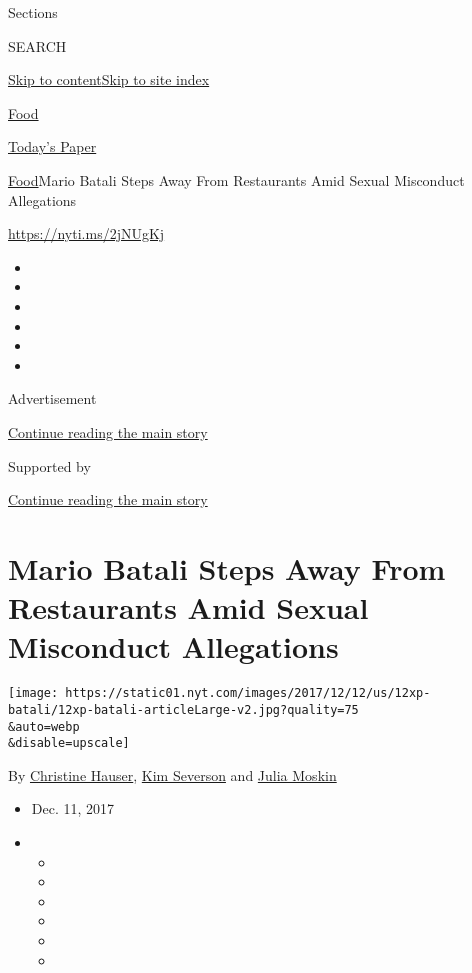 Sections

SEARCH

\protect\hyperlink{site-content}{Skip to
content}\protect\hyperlink{site-index}{Skip to site index}

\href{https://www.nytimes.com/section/food}{Food}

\href{https://myaccount.nytimes.com/auth/login?response_type=cookie\&client_id=vi}{}

\href{https://www.nytimes.com/section/todayspaper}{Today's Paper}

\href{/section/food}{Food}\textbar{}Mario Batali Steps Away From
Restaurants Amid Sexual Misconduct Allegations

\url{https://nyti.ms/2jNUgKj}

\begin{itemize}
\item
\item
\item
\item
\item
\item
\end{itemize}

Advertisement

\protect\hyperlink{after-top}{Continue reading the main story}

Supported by

\protect\hyperlink{after-sponsor}{Continue reading the main story}

\hypertarget{mario-batali-steps-away-from-restaurants-amid-sexual-misconduct-allegations}{%
\section{Mario Batali Steps Away From Restaurants Amid Sexual Misconduct
Allegations}\label{mario-batali-steps-away-from-restaurants-amid-sexual-misconduct-allegations}}

\texttt{[image: https://static01.nyt.com/images/2017/12/12/us/12xp-batali/12xp-batali-articleLarge-v2.jpg?quality=75\\\&auto=webp\\\&disable=upscale]}

By \href{http://www.nytimes.com/by/christine-hauser}{Christine Hauser},
\href{http://www.nytimes.com/by/kim-severson}{Kim Severson} and
\href{http://www.nytimes.com/by/julia-moskin}{Julia Moskin}

\begin{itemize}
\item
  Dec. 11, 2017
\item
  \begin{itemize}
  \item
  \item
  \item
  \item
  \item
  \item
  \end{itemize}
\end{itemize}

